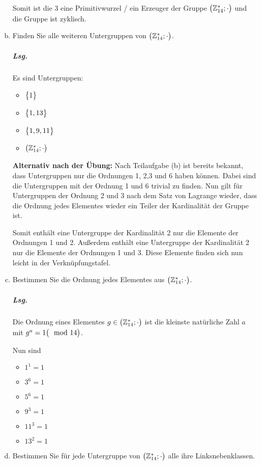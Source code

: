 \documentclass{scrreprt}
\begin{document}
\begin{enumerate}[(a)]
  Somit ist die 3 eine Primitivwurzel / ein Erzeuger der Gruppe
  $\qty\big(\mathbb{Z}_{14}^*; \cdot)$ und die Gruppe ist zyklisch.

\item Finden Sie alle weiteren Untergruppen von
  $\qty\big(\mathbb{Z}_{14}^*; \cdot)$.

  \subparagraph{Lsg.} Es sind Untergruppen:
  \begin{itemize}
  \item $\qty\big{1}$
  \item $\qty\big{1, 13}$
  \item $\qty\big{1, 9, 11}$
  \item $\qty\big(\mathbb{Z}_{14}^*; \cdot)$
  \end{itemize}

  \textbf{Alternativ nach der Übung:} Nach Teilaufgabe (b) ist bereits bekannt,
  dass Untergruppen nur die Ordnungen 1, 2,3 und 6 haben können.
  Dabei sind die Untergruppen mit der Ordnung 1 und 6 trivial zu finden.
  Nun gilt für Untergruppen der Ordnung 2 und 3 nach dem Satz von Lagrange
  wieder, dass die Ordnung jedes Elementes wieder ein Teiler der Kardinalität der
  Gruppe ist.

  Somit enthält eine Untergruppe der Kardinalität 2 nur die Elemente der
  Ordnungen 1 und 2.
  Außerdem enthält eine Untergruppe der Kardinalität 2 nur die Elemente der
  Ordnungen 1 und 3.
  Diese Elemente finden sich nun leicht in der Verknüpfungstafel.

\item Bestimmen Sie die Ordnung jedes Elementes aus
  $\qty\big(\mathbb{Z}_{14}^*; \cdot)$.

  \subparagraph{Lsg.} Die Ordnung eines Elementes
  $g \in \qty\big(\mathbb{Z}_{14}^*; \cdot)$ ist die kleinste natürliche Zahl
  $a$ mit $g^a = 1 \qty\big(\mod 14)$.

  Nun sind
  \begin{itemize}
  \item $1^1 = 1$
  \item $3^6 = 1$
  \item $5^6 = 1$
  \item $9^3 = 1$
  \item $11^3 = 1$
  \item $13^2 = 1$
  \end{itemize}

\item Bestimmen Sie für jede Untergruppe von $\qty\big(\mathbb{Z}_{14}^*; \cdot)$
  alle ihre Linksnebenklassen.


\end{enumerate}
\end{document}
